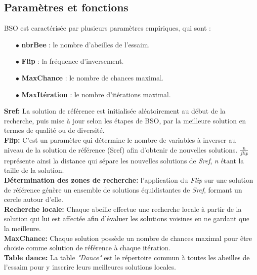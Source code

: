\newpage

\subsection{Paramètres et fonctions}
BSO est caractérisée par plusieurs paramètres empiriques, qui sont : 
\begin{itemize}
	\item[$\bullet$] \textbf{nbrBee} : le nombre d'abeilles de l'essaim.
	\item[$\bullet$] \textbf{Flip} : la fréquence d'inversement.
	\item[$\bullet$] \textbf{MaxChance} : le nombre de chances maximal. 
	\item[$\bullet$] \textbf{MaxItération} : le nombre d'itérations maximal.\\
\end{itemize}

\textbf{Sref:} La solution de référence est initialisée aléatoirement au début de la recherche, puis mise à jour selon les étapes de BSO, par la meilleure solution en termes de qualité ou de diversité.\\ 

\textbf{Flip:}
C'est un paramètre qui détermine le nombre de variables à inverser au niveau de la solution de référence (Sref) afin d'obtenir de nouvelles solutions. $\frac{n}{flip}$ représente ainsi la distance qui sépare les nouvelles solutions de \textit{Sref}, \textit{n} étant la taille de la solution. \\

\textbf{Détermination des zones de recherche:}
l'application du \textit{Flip} sur une solution de référence génère un ensemble de solutions équidistantes de \textit{Sref}, formant un cercle autour d'elle.\\


\textbf{Recherche locale:}
Chaque abeille effectue une recherche locale à partir de la solution qui lui est affectée afin d’évaluer les solutions voisines en ne gardant que la meilleure.\\

\textbf{MaxChance:}
Chaque solution possède un nombre de chances maximal pour être choisie comme solution de référence à chaque itération.\\


\textbf{Table dance:}
La table \textit{"Dance"} est le répertoire commun à toutes les abeilles de l'essaim pour y inscrire leurs meilleures solutions locales.\\

